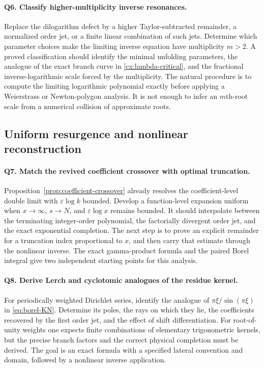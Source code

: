 \documentclass[11pt,a4paper]{article}
\numberwithin{equation}{section}
\theoremstyle{definition}
\theoremstyle{remark}
\newcommand{\eps}{\varepsilon}
\begin{document}
\paragraph{Q6. Classify higher-multiplicity inverse resonances.}
Replace the dilogarithm defect by a higher Taylor-subtracted
remainder, a normalized order jet, or a finite linear combination
of such jets. Determine which parameter choices make the limiting
inverse equation have multiplicity $m>2$. A proved classification
should identify the minimal unfolding parameters, the analogue of
the exact branch curve in \eqref{cx:lambda-critical}, and the
fractional inverse-logarithmic scale forced by the multiplicity.
The natural procedure is to compute the limiting logarithmic
polynomial exactly before applying a Weierstrass or Newton-polygon
analysis. It is not enough to infer an $m$th-root scale from a
numerical collision of approximate roots.

\subsection{Uniform resurgence and nonlinear reconstruction}

\paragraph{Q7. Match the revived coefficient crossover with optimal truncation.}
Proposition~\ref{prop:coefficient-crossover} already resolves the
coefficient-level double limit with
$\eps\log k$ bounded. Develop a function-level expansion uniform
when $x\to\infty$, $s\to N$, and $\eps\log x$ remains bounded.
It should interpolate between the terminating integer-order
polynomial, the factorially divergent order jet, and the exact
exponential completion. The next step is to prove an explicit
remainder for a truncation index proportional to $x$, and then
carry that estimate through the nonlinear inverse. The exact
gamma-product formula and the paired Borel integral give two
independent starting points for this analysis.

\paragraph{Q8. Derive Lerch and cyclotomic analogues of the residue kernel.}
For periodically weighted Dirichlet series, identify the analogue
of
$\pi\xi/\sin(\pi\xi)$ in \eqref{eq:borel-KN}. Determine its poles,
the rays on which they lie, the coefficients recovered by the
first order jet, and the effect of shift differentiation.
For root-of-unity weights one expects finite combinations of
elementary trigonometric kernels, but the precise branch factors
and the correct physical completion must be derived. The goal
is an exact formula with a specified lateral convention and
domain, followed by a nonlinear inverse application.
\end{document}
